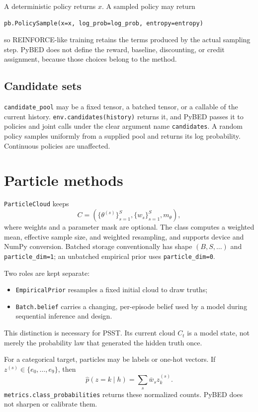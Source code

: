 \documentclass[11pt]{article}
\begin{document}
A deterministic policy returns $x$. A sampled policy may return
\begin{lstlisting}
pb.PolicySample(x=x, log_prob=log_prob, entropy=entropy)
\end{lstlisting}
so REINFORCE-like training retains the terms produced by the actual sampling step.
PyBED does not define the reward, baseline, discounting, or credit assignment,
because those choices belong to the method.

\subsection{Candidate sets}

\texttt{candidate\_pool} may be a fixed tensor, a batched tensor, or a callable of
the current history. \texttt{env.candidates(history)} returns it, and PyBED passes
it to policies and joint calls under the clear argument name \texttt{candidates}.
A random policy samples uniformly from a supplied pool and returns its log
probability. Continuous policies are unaffected.

\section{Particle methods}

\texttt{ParticleCloud} keeps
\begin{equation}
  C=(\{\theta^{(s)}\}_{s=1}^{S},\{w_s\}_{s=1}^{S},m_\theta),
\end{equation}
where weights and a parameter mask are optional. The class computes a weighted
mean, effective sample size, and weighted resampling, and supports device and NumPy
conversion. Batched storage conventionally has shape
$(B,S,\ldots)$ and \texttt{particle\_dim=1}; an unbatched empirical prior uses
\texttt{particle\_dim=0}.

Two roles are kept separate:
\begin{itemize}
  \item \texttt{EmpiricalPrior} resamples a fixed initial cloud to draw truths;
  \item \texttt{Batch.belief} carries a changing, per-episode belief used by a
  model during sequential inference and design.
\end{itemize}
This distinction is necessary for PSST. Its current cloud $C_t$ is a model state,
not merely the probability law that generated the hidden truth once.

For a categorical target, particles may be labels or one-hot vectors. If
$z^{(s)}\in\{e_0,\ldots,e_9\}$, then
\begin{equation}
  \widehat p(z=k\mid h)=\sum_s \bar w_s z^{(s)}_k.
\end{equation}
\texttt{metrics.class\_probabilities} returns these normalized counts. PyBED does
not sharpen or calibrate them.
\end{document}
